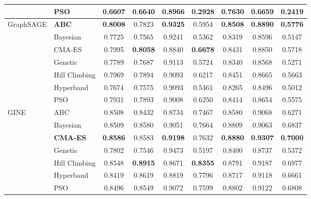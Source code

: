 \documentclass[conference]{IEEEtran}
\begin{document}
\begin{table}[htbp]
\begin{tabular}{llccccccc}
    & PSO          & 0.6607 & 0.6640          & 0.8966          & 0.2928          & 0.7630 & 0.6659          & 0.2419 \\
\hline
\multirow{7}{*}{GraphSAGE}
    & \textbf{ABC} & \textbf{0.8008} & 0.7823 & \textbf{0.9325} & 0.5954          & \textbf{0.8508} & \textbf{0.8890} & \textbf{0.5776} \\
    & Bayesian     & 0.7725 & 0.7565          & 0.9241          & 0.5362          & 0.8319 & 0.8596          & 0.5147 \\
    & CMA-ES       & 0.7995 & \textbf{0.8058} & 0.8840          & \textbf{0.6678} & 0.8431 & 0.8850          & 0.5718 \\
    & Genetic      & 0.7789 & 0.7687          & 0.9113          & 0.5724          & 0.8340 & 0.8568          & 0.5271 \\
    & Hill Climbing& 0.7969 & 0.7894          & 0.9093          & 0.6217          & 0.8451 & 0.8665          & 0.5663 \\
    & Hyperband    & 0.7674 & 0.7575          & 0.9093          & 0.5461          & 0.8265 & 0.8496          & 0.5012 \\
    & PSO          & 0.7931 & 0.7893          & 0.9008          & 0.6250          & 0.8414 & 0.8654          & 0.5575 \\
\hline
\multirow{7}{*}{GINE}
    & ABC          & 0.8508 & 0.8432          & 0.8734          & 0.7467          & 0.8580 & 0.9068          & 0.6271 \\
    & Bayesian     & 0.8509 & 0.8580          & 0.9051          & 0.7664          & 0.8809 & 0.9063          & 0.6837 \\
    & \textbf{CMA-ES} & \textbf{0.8586} & 0.8583 & \textbf{0.9198} & 0.7632        & \textbf{0.8880} & \textbf{0.9307} & \textbf{0.7000} \\
    & Genetic      & 0.7802 & 0.7546          & 0.9473          & 0.5197          & 0.8400 & 0.8737          & 0.5372 \\
    & Hill Climbing& 0.8548 & \textbf{0.8915} & 0.8671          & \textbf{0.8355} & 0.8791 & 0.9187          & 0.6977 \\
    & Hyperband    & 0.8419 & 0.8619          & 0.8819          & 0.7796          & 0.8717 & 0.9118          & 0.6661 \\
    & PSO          & 0.8496 & 0.8549          & 0.9072          & 0.7599          & 0.8802 & 0.9122          & 0.6808 \\
\hline
\end{tabular}
\end{table}
\end{document}
